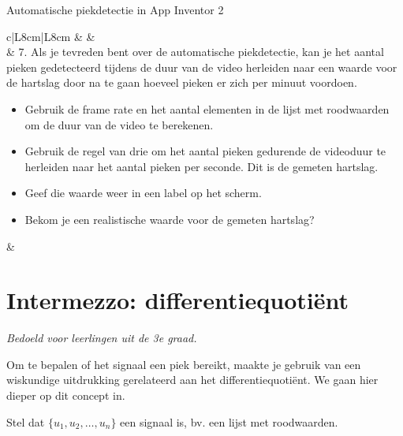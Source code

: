 \begin{opdracht}{Automatische piekdetectie in App Inventor 2}
	\begin{tabular}{c|L{8cm}|L{8cm}}
	&   &   \\
	\hline
	& 7. Als je tevreden bent over de automatische piekdetectie, kan je het aantal pieken gedetecteerd tijdens de duur van de video herleiden naar een waarde voor de hartslag door na te gaan hoeveel pieken er zich per minuut voordoen. \newline
	\begin{itemize}
		\item Gebruik de frame rate en het aantal elementen in de lijst met roodwaarden om de duur van de video te berekenen. 
		\item Gebruik de regel van drie om het aantal pieken gedurende de videoduur te herleiden naar het aantal pieken per seconde. Dit is de gemeten hartslag. 
		\item Geef die waarde weer in een label op het scherm. 
		\item Bekom je een realistische waarde voor de gemeten hartslag?
	\end{itemize} & \\
	\end{tabular}

\opdrachteindbalk
\end{opdracht}

\section{Intermezzo: differentiequoti\"ent}
\label{sec:Mod4_Sec2}
%
\emph{Bedoeld voor leerlingen uit de 3e graad.}

Om te bepalen of het signaal een piek bereikt, maakte je gebruik van een wiskundige uitdrukking gerelateerd aan het differentiequoti\"ent. We gaan hier dieper op dit concept in.

Stel dat $\{ u_1, u_2, \ldots, u_n\}$ een signaal is, bv. een lijst met roodwaarden. 


